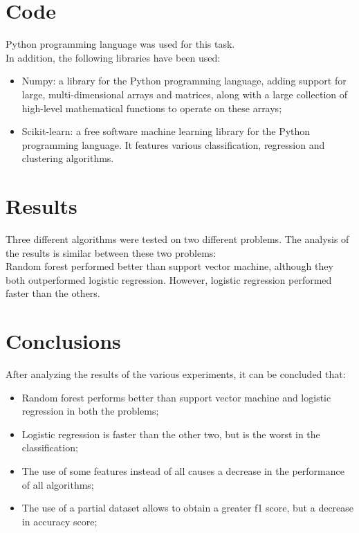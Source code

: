 \documentclass[11pt]{article}
\begin{document}
\pagebreak
\section{Code}
Python programming language was used for this task. \\
In addition, the following libraries have been used:
\begin{itemize}
	\item Numpy: a library for the Python programming language, adding support for large, multi-dimensional arrays and matrices, along with a large collection of high-level mathematical functions to operate on these arrays;
	\item Scikit-learn: a free software machine learning library for the Python programming language. It features various classification, regression and clustering algorithms.
\end{itemize}

\section{Results}
Three different algorithms were tested on two different problems. The analysis of the results is similar between these two problems: \\ 
Random forest performed better than support vector machine, although they both outperformed logistic regression. However, logistic regression performed faster than the others.

\section{Conclusions}
After analyzing the results of the various experiments, it can be concluded that:
\begin{itemize}
	\item Random forest performs better than support vector machine and logistic regression in both the problems;
	\item Logistic regression is faster than the other two, but is the worst in the classification;
	\item The use of some features instead of all causes a decrease in the performance of all algorithms;
	\item The use of a partial dataset allows to obtain a greater f1 score, but a decrease in accuracy score;
\end{itemize}

	
	
\end{document}
